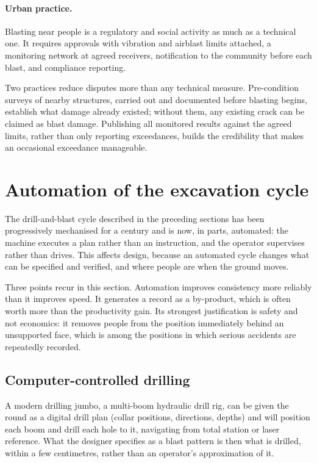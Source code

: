 \paragraph{Urban practice.}
Blasting near people is a regulatory and social activity as much as a
technical one. It requires approvals with vibration and airblast limits
attached, a monitoring network at agreed receivers, notification to the
community before each blast, and compliance reporting.

Two practices reduce disputes more than any technical measure. Pre-condition
surveys of nearby structures, carried out and documented before blasting
begins, establish what damage already existed; without them, any
existing crack can be claimed as blast damage. Publishing all monitored results
against the agreed limits, rather than only reporting exceedances, builds the
credibility that makes an occasional exceedance manageable.

\section{Automation of the excavation cycle}
\label{sec:automation}

The drill-and-blast cycle described in the preceding sections has been
progressively mechanised for a century and is now, in parts, automated: the
machine executes a plan rather than an instruction, and the operator supervises
rather than drives. This affects design, because an automated
cycle changes what can be specified and verified, and where
people are when the ground moves.

Three points recur in this section. Automation improves consistency more
reliably than it improves speed. It generates a record as a by-product, which
is often worth more than the productivity gain. Its strongest
justification is safety and not economics: it removes people from the position
immediately behind an unsupported face, which is among the positions in which
serious accidents are repeatedly recorded.

\subsection{Computer-controlled drilling}
\label{sec:automated-drilling}

A modern drilling jumbo, a multi-boom hydraulic drill rig, can be given the
round as a digital drill plan
(collar positions, directions, depths) and will position each boom and drill
each hole to it, navigating from total station or laser reference. What the
designer specifies as a blast pattern is then what is drilled, within a few
centimetres, rather than an operator's approximation of it.

